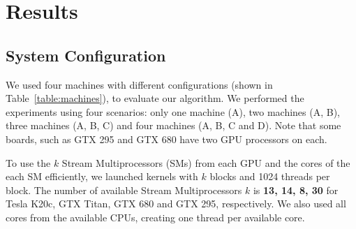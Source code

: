 \documentclass[journal]{IEEEtran}
\begin{document}

\section{Results}


\subsection{System Configuration}

We used four machines with different configurations (shown in
Table~\ref{table:machines}), to evaluate our algorithm. We performed the
experiments using four scenarios: only one machine (A), two machines (A, B),
three machines (A, B, C) and four machines (A, B, C and D). Note that some
boards, such as GTX 295 and GTX 680 have two GPU processors on each.

To use the $k$ Stream Multiprocessors (SMs) from each GPU and the cores of the
each SM efficiently, we launched kernels with $k$ blocks and 1024 threads per
block. The number of available Stream Multiprocessors $k$ is \textbf{13, 14, 8,
  30} for Tesla K20c, GTX Titan, GTX 680 and GTX 295, respectively. We also used
all cores from the available CPUs, creating one thread per available core.

 
\end{document}
